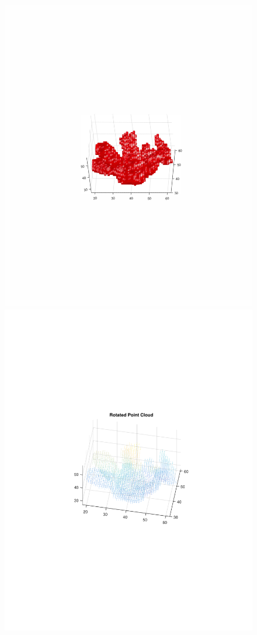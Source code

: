 \documentclass{UCF_ETD}
\begin{document}
\begin{figure}[H]
\begin{center}
\includegraphics[scale=0.5]{RobustRegistration/RotatedPartialBunnyObject}
\includegraphics[scale=0.5]{RobustRegistration/RotatedPartialBunnyObject_pointCloud}

\end{center}
\end{figure}
\end{document}
